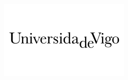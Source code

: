 \documentclass{beamer}
\begin{document}
\begin{frame}
{{\begin{minipage}{.15\textwidth}\includegraphics[width=\columnwidth]{../img/logo_uvigo.png}\end{minipage}%

}}
\end{frame}
\end{document}
